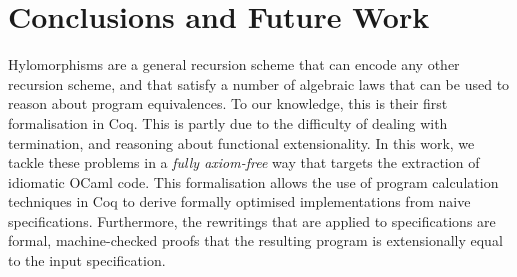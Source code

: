 \documentclass[a4paper,anonymous, UKenglish,cleveref, autoref, thm-restate]{lipics-v2021}
\newcommand{\haskell}[1]{\texttt{#1}}
\begin{document}


\section{Conclusions and Future Work}

Hylomorphisms are a general recursion scheme that can encode any other
recursion scheme, and that satisfy a number of algebraic laws that can be used
to reason about program equivalences. To our knowledge, this is their first formalisation
in Coq. This is partly due to the
difficulty of dealing with termination, and reasoning about functional
extensionality. In this work, we tackle these problems in a \emph{fully
axiom-free} way that targets the extraction of idiomatic OCaml code.  This
formalisation allows the use of program calculation techniques in Coq to derive
formally optimised implementations from naive specifications. Furthermore, the
rewritings that are applied to specifications are formal, machine-checked
proofs that the resulting program is extensionally equal to the input
specification. 
\end{document}
